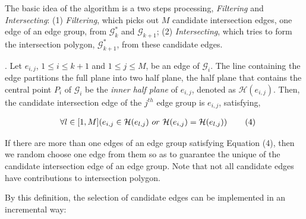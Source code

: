 The basic idea of the algorithm is a two steps processing, \ie \emph{Filtering} and \emph{Intersecting}:
 (1) \emph{Filtering}, which picks out $M$ candidate intersection edges, one edge of an edge group, from $\mathcal{G}^*_k $ and $\mathcal{G}_{k+1}$;
 (2) \emph{Intersecting}, which tries to form the intersection polygon, \ie $\mathcal{G}^*_{k+1}$, from these candidate edges.



.
Let $e_{i,j}$, $1 \le i \le k+1$ and $1 \le j \le M$, be an edge of $\mathcal{G}_{i}$. The line containing the edge partitions the full plane into two half plane, the half plane that contains the central point $P_i$ of $\mathcal{G}_i$ be the \emph{inner half plane} of $e_{i,j}$, denoted as $\mathcal{H}(e_{i,j})$.
%
Then, the candidate intersection edge of the $j^{th}$ edge group is $e_{i,j}$, satisfying,

\vspace{-2ex}
\begin{equation*}
\label{equ-inter-edge-full}
    \begin{aligned}
        \hspace{2ex}  \forall l \in [1, M] (e_{i,j} \in \mathcal{H}(e_{l,j}) ~or~ \mathcal{H}(e_{i,j}) = \mathcal{H}(e_{l,j}) )    \hspace{5ex} (4)\\
    \end{aligned}
\end{equation*}
\vspace{-2ex}


If there are more than one edges of an edge group satisfying Equation (4), then we random choose one edge from them so as to guarantee the unique of the candidate intersection edge of an edge group. Note that not all candidate edges have contributions to intersection polygon.


By this definition, the selection of candidate edges can be implemented in an incremental way:

